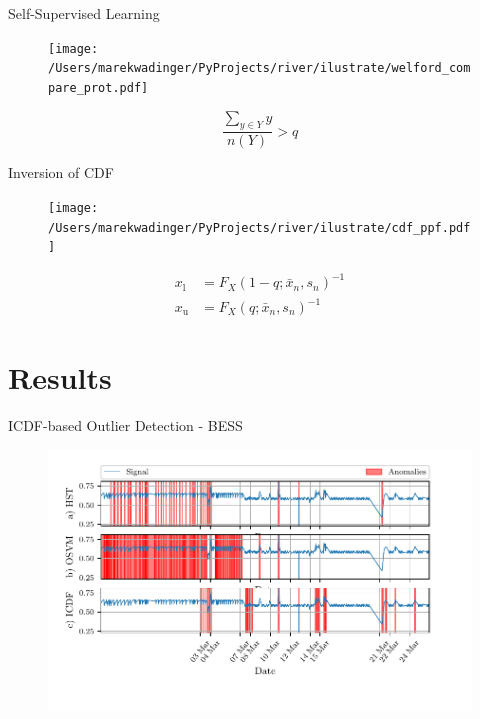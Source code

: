 \documentclass{beamer}
\newcommand{\ui}[2]{#1 _{\mathrm{#2}}}
\begin{document}
\begin{frame}{Self-Supervised Learning}
    \begin{figure}
        \begin{center}
            \texttt{[image: /Users/marekwadinger/PyProjects/river/ilustrate/welford\_compare\_prot.pdf]}
        \end{center}
    \end{figure}
    \begin{equation}
        {\frac{\sum_{y\in Y}y}{n(Y)}} > q\text{} \label{eq:update}
    \end{equation}
\end{frame}

\begin{frame}{Inversion of CDF}
    \begin{figure}
        \begin{center}
            \texttt{[image: /Users/marekwadinger/PyProjects/river/ilustrate/cdf\_ppf.pdf]}
        \end{center}
    \end{figure}
    \begin{align*}
        \ui{x}{l} & = F_{X}(1 - q; \bar x_n, s_n)^{-1} \\
        \ui{x}{u} & = F_{X}(q; \bar x_n, s_n)^{-1}
    \end{align*}
\end{frame}

\section{Results}

\begin{frame}{ICDF-based Outlier Detection - BESS}
    \begin{figure}[htpb]
        \begin{center}
            \includegraphics[width=\linewidth]{figures/Average_Cell_Temperature_sliding_compare_anomalies.pdf}
        \end{center}
    \end{figure}
\end{frame}
\end{document}

